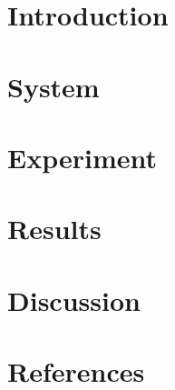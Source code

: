 \documentclass[review,3p,authoryear]{elsarticle}
\begin{document}

\clearpage
\section{Introduction}\label{s:intro}

\section{System}\label{s:system}

\section{Experiment}\label{s:exp}

\section{Results}\label{s:results}

\section{Discussion}\label{s:discussion}

%
\clearpage

\clearpage
\section*{References}

\clearpage
\initappendix
\end{document}
